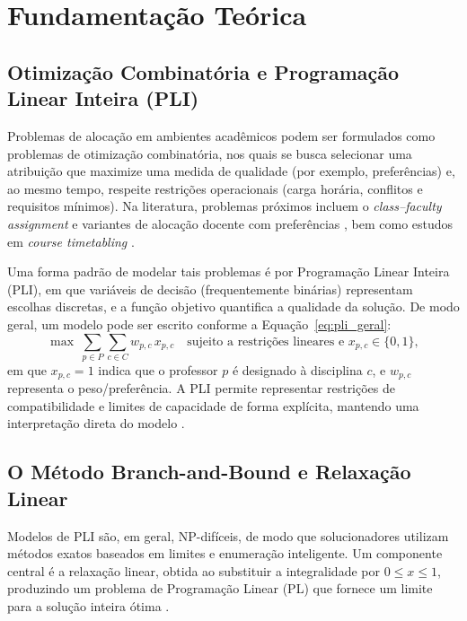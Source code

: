 \chapter{Fundamentação Teórica}

\section{Otimização Combinatória e Programação Linear Inteira (PLI)}


Problemas de alocação em ambientes acadêmicos podem ser formulados como problemas de otimização combinatória, nos quais se busca selecionar uma atribuição que maximize uma medida de qualidade (por exemplo, preferências) e, ao mesmo tempo, respeite restrições operacionais (carga horária, conflitos e requisitos mínimos). Na literatura, problemas próximos incluem o \textit{class--faculty assignment} e variantes de alocação docente com preferências \cite{al_yakoob_sherali_2006,al_yakoob_sherali_2013,domenech_lusa_2016}, bem como estudos em \textit{course timetabling} \cite{carter_laporte_1998,avella_vasilyev_2005}.

Uma forma padrão de modelar tais problemas é por Programação Linear Inteira (PLI), em que variáveis de decisão (frequentemente binárias) representam escolhas discretas, e a função objetivo quantifica a qualidade da solução. De modo geral, um modelo pode ser escrito conforme a Equação~\eqref{eq:pli_geral}:
\begin{equation} \label{eq:pli_geral}
\max\ \sum_{p \in P}\sum_{c \in C} w_{p,c}\,x_{p,c}\quad \text{sujeito a restrições lineares e } x_{p,c}\in\{0,1\},
\end{equation}
em que $x_{p,c}=1$ indica que o professor $p$ é designado à disciplina $c$, e $w_{p,c}$ representa o peso/preferência. A PLI permite representar restrições de compatibilidade e limites de capacidade de forma explícita, mantendo uma interpretação direta do modelo \cite{vanderbei_2014,wolsey_2020}.

\section{O Método Branch-and-Bound e Relaxação Linear}

Modelos de PLI são, em geral, NP-difíceis, de modo que solucionadores utilizam métodos exatos baseados em limites e enumeração inteligente. Um componente central é a relaxação linear, obtida ao substituir a integralidade por $0\le x\le 1$, produzindo um problema de Programação Linear (PL) que fornece um limite para a solução inteira ótima \cite{vanderbei_2014,wolsey_2020}.

